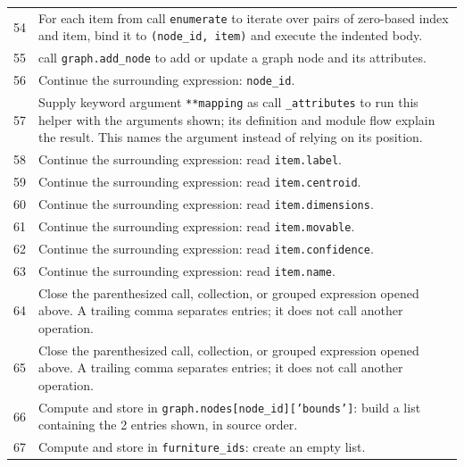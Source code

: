 \documentclass[11pt,a4paper]{book}
\begin{document}
\begin{longtable}{r p{}}
54 & For each item from call \texttt{enumerate} to iterate over pairs of zero-based index and item, bind it to \texttt{(node\_id, item)} and execute the indented body. \\

55 & call \texttt{graph.add\_node} to add or update a graph node and its attributes. \\

56 & Continue the surrounding expression: \texttt{node\_id}. \\

57 & Supply keyword argument \texttt{**mapping} as call \texttt{\_attributes} to run this helper with the arguments shown; its definition and module flow explain the result. This names the argument instead of relying on its position. \\

58 & Continue the surrounding expression: read \texttt{item.label}. \\

59 & Continue the surrounding expression: read \texttt{item.centroid}. \\

60 & Continue the surrounding expression: read \texttt{item.dimensions}. \\

61 & Continue the surrounding expression: read \texttt{item.movable}. \\

62 & Continue the surrounding expression: read \texttt{item.confidence}. \\

63 & Continue the surrounding expression: read \texttt{item.name}. \\

64 & Close the parenthesized call, collection, or grouped expression opened above. A trailing comma separates entries; it does not call another operation. \\

65 & Close the parenthesized call, collection, or grouped expression opened above. A trailing comma separates entries; it does not call another operation. \\

66 & Compute and store in \texttt{graph.nodes[node\_id]['bounds']}: build a list containing the 2 entries shown, in source order.  \\

67 & Compute and store in \texttt{furniture\_ids}: create an empty list.  \\


\end{longtable}
\end{document}
